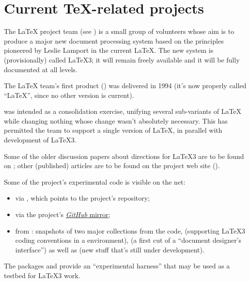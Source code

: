 
\section{Current \TeX{}-related projects}


The \LaTeX{} project team (see )
is a small group of volunteers whose aim is
to produce a major new document processing system based on the
principles pioneered by Leslie Lamport in the current \LaTeX{}.  The
new system is (provisionally) called \LaTeX{}3; it
will remain freely available and it will be fully documented at
all levels.

The \LaTeX{} team's first product (\LaTeXe{}) was delivered in 1994
(it's now properly called ``\LaTeX{}'', since no other version is current).

\LaTeXe{} was intended as a consolidation exercise, unifying several
sub-variants of \LaTeX{} while changing nothing whose change wasn't
absolutely necessary.  This has permitted the team to support a single
version of \LaTeX{}, in parallel with development of \LaTeX{}3.

Some of the older discussion papers about directions for \LaTeX{}3 are
to be found on ; other (published) articles are to be found
on the project web site ().

Some of the project's experimental code is visible on the net:
\begin{itemize}
\item via , which points
  to the project's  repository;
\item via the project's
  \href{https://github.com/latex3/svn-mirror}{\emph{GitHub} mirror};
\item from : snapshots of two major collections from the
  code,  (supporting \LaTeX{}3 coding conventions in
  a \LaTeXe{} environment),  (a first cut of a
  ``document designer's interface'') as well as
   (new stuff that's still under
  development).
\end{itemize}
The packages  and  provide an
``experimental harness'' that may be used as a testbed for \LaTeX{}3
work.

